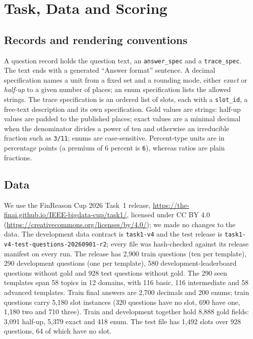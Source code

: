 \documentclass[conference]{IEEEtran}
\newcommand{\id}[1]{\texttt{#1}}
\begin{document}
\section{Task, Data and Scoring}\label{sec:task}

\subsection{Records and rendering conventions}
A question record holds the question text, an \id{answer\_spec} and a \id{trace\_spec}. The text ends with a generated ``Answer format'' sentence. A decimal specification names a unit from a fixed set and a rounding mode, either \emph{exact} or \emph{half-up} to a given number of places; an enum specification lists the allowed strings. The trace specification is an ordered list of slots, each with a \id{slot\_id}, a free-text description and its own specification. Gold values are strings: half-up values are padded to the published places; exact values are a minimal decimal when the denominator divides a power of ten and otherwise an irreducible fraction such as \id{3/11}; enums are case-sensitive. Percent-type units are in percentage points (a premium of 6 percent is \id{6}), whereas ratios are plain fractions.

\subsection{Data}
We use the FinReason Cup 2026 Task~1 release, \url{https://the-finai.github.io/IEEE-bigdata-cup/task1/}, licensed under CC BY 4.0 (\url{https://creativecommons.org/licenses/by/4.0/}); we made no changes to the data. The development data contract is \id{task1-v4} and the test release is \id{task1-v4-test-questions-20260901-r2}; every file was hash-checked against its release manifest on every run. The release has 2,900 train questions (ten per template), 290 development questions (one per template), 580 development-leaderboard questions without gold and 928 test questions without gold. The 290 seen templates span 58 topics in 12 domains, with 116 basic, 116 intermediate and 58 advanced templates. Train final answers are 2,700 decimals and 200 enums; train questions carry 5,180 slot instances (320 questions have no slot, 690 have one, 1,180 two and 710 three). Train and development together hold 8,888 gold fields: 3,091 half-up, 5,379 exact and 418 enum. The test file has 1,492 slots over 928 questions, 64 of which have no slot.
\end{document}
